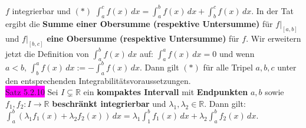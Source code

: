 \documentclass[landscape, 10pt]{article}
\newcommand{\R}{\mathbb{R}}
\begin{document}
\begin{multicols}{3}
                     \textcolor{NavyBlue}{$f$} integrierbar und $(*)$ 
                     \textcolor{NavyBlue}{
                     $\int_a^cf(x)\,dx=\int_a^bf(x)\,dx+\int_b^cf(x)\,dx$}.
                     In der Tat ergibt die \textbf{Summe einer Obersumme 
                     (respektive Untersumme)} für 
                     \textcolor{NavyBlue}{$f|_{[a,b]}$} und 
                     \textcolor{NavyBlue}{$f|_{[b,c]}$} 
                     \textbf{eine Obersumme (respektive Untersumme)} für 
                     \textcolor{NavyBlue}{$f$}. Wir
                     erweitern jetzt die Definition von 
                     \textcolor{NavyBlue}{$\int_a^bf(x)\,dx$} auf: 
                     \textcolor{NavyBlue}{$\int_a^af(x)\,dx=0$} und wenn 
                     \textcolor{NavyBlue}{$a<b,\,\int_b^af(x)\,dx:=-\int_a^bf(x)\,dx$}.
                     Dann gilt $(*)$ für alle Tripel \textcolor{NavyBlue}{$a,b,c$} 
                     unter den entsprechenden Integrabilitätsvoraussetzungen. \\
              \colorbox{magenta}{Satz 5.2.10}
                     Sei \textcolor{NavyBlue}{$I\subsetneq\R$} 
                     ein \textbf{kompaktes Intervall} 
                     mit \textbf{Endpunkten} \textcolor{NavyBlue}{$a,b$} sowie 
                     \textcolor{NavyBlue}{$f_1,f_2:I\longrightarrow\R$}
                     \textbf{beschränkt 
                     integrierbar} und \textcolor{NavyBlue}{$\lambda_1,\lambda_2\in\R$}. 
                     Dann gilt: 
                     \textcolor{NavyBlue}{
                     $\int_a^b(\lambda_1f_1(x)
                     +\lambda_2f_2(x))\,dx
                     =\lambda_1\int_1^bf_1(x)\,dx
                     +\lambda_2\int_a^bf_2(x)\,dx$}.

\end{multicols}
\end{document}
